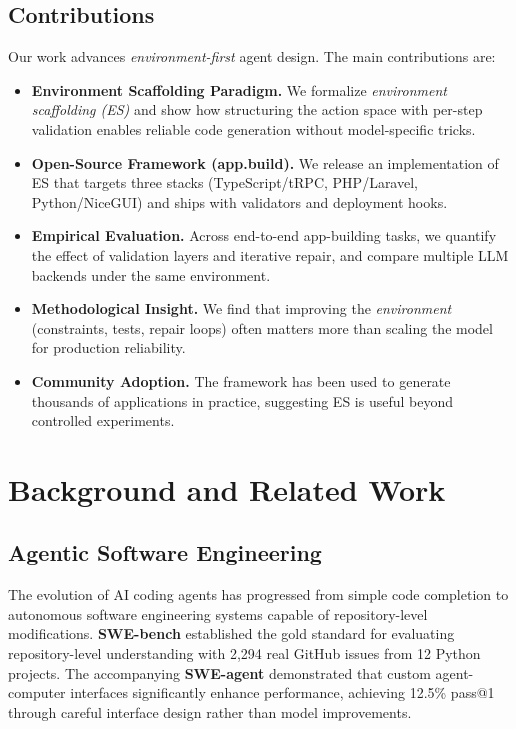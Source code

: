 \documentclass[11pt]{article}
\begin{document}
\subsection{Contributions}

Our work advances \emph{environment-first} agent design. The main contributions are:

\begin{itemize}
  \item \textbf{Environment Scaffolding Paradigm.} We formalize \emph{environment scaffolding (ES)} and show how structuring the action space with per-step validation enables reliable code generation without model-specific tricks.
  \item \textbf{Open-Source Framework (app.build).} We release an implementation of ES that targets three stacks (TypeScript/tRPC, PHP/Laravel, Python/NiceGUI) and ships with validators and deployment hooks.
  \item \textbf{Empirical Evaluation.} Across end-to-end app-building tasks, we quantify the effect of validation layers and iterative repair, and compare multiple LLM backends under the same environment.
  \item \textbf{Methodological Insight.} We find that improving the \emph{environment} (constraints, tests, repair loops) often matters more than scaling the model for production reliability.
  \item \textbf{Community Adoption.} The framework has been used to generate thousands of applications in practice, suggesting ES is useful beyond controlled experiments.
\end{itemize}

\section{Background and Related Work}
\label{sec:related}

\subsection{Agentic Software Engineering}

The evolution of AI coding agents has progressed from simple code completion to autonomous software engineering systems capable of repository-level modifications. \textbf{SWE-bench} \citep{jimenez2024swe} established the gold standard for evaluating repository-level understanding with 2,294 real GitHub issues from 12 Python projects. The accompanying \textbf{SWE-agent} \citep{yang2024swe} demonstrated that custom agent-computer interfaces significantly enhance performance, achieving 12.5\% pass@1 through careful interface design rather than model improvements.
\end{document}
